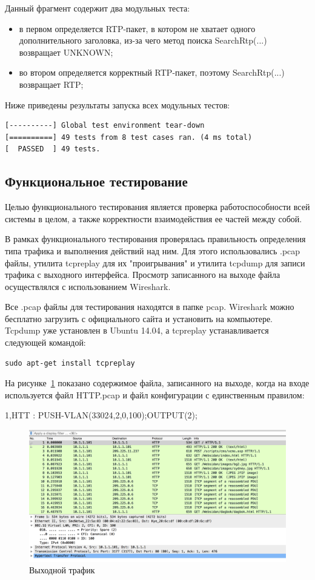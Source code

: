 Данный фрагмент содержит два модульных теста:
\begin{itemize}
\item в первом определяется RTP-пакет, в котором не хватает одного дополнительного заголовка, из-за чего метод поиска SearchRtp(...) возвращает UNKNOWN;
\item во втором определяется корректный RTP-пакет, поэтому SearchRtp(...) возвращает RTP;
\end{itemize}

Ниже приведены результаты запуска всех модульных тестов:
\begin{lstlisting}
[----------] Global test environment tear-down
[==========] 49 tests from 8 test cases ran. (4 ms total)
[  PASSED  ] 49 tests.
\end{lstlisting}

\subsection{Функциональное тестирование}
Целью функционального тестирования является проверка работоспособности всей системы в целом, а также корректности взаимодействия ее частей между собой.

В рамках функционального тестирования проверялась правильность определения типа трафика и выполнения действий над ним. Для этого использовались .pcap файлы, утилита tcpreplay для их "проигрывания" и утилита tcpdump для записи трафика с выходного интерфейса. Просмотр записанного на выходе файла осуществлялся с использованием Wireshark.

Все .pcap файлы для тестирования находятся в папке pcap. Wireshark можно бесплатно загрузить с официального сайта и установить на компьютере. Tcpdump уже установлен в Ubuntu 14.04, а tcpreplay устанавливается следующей командой:
\begin{lstlisting}
sudo apt-get install tcpreplay
\end{lstlisting}

На рисунке~\ref{pic:wireshark} показано содержимое файла, записанного на выходе, когда на входе используется файл HTTP.pcap и файл конфигурации с единственным правилом:
\begin{center}
1,HTT : PUSH-VLAN(33024,2,0,100);OUTPUT(2);
\end{center}

\begin{figure}
\centering
\includegraphics[scale=0.45]{pictures/wireshark}
\caption{Выходной трафик}
\label{pic:wireshark}
\end{figure}

